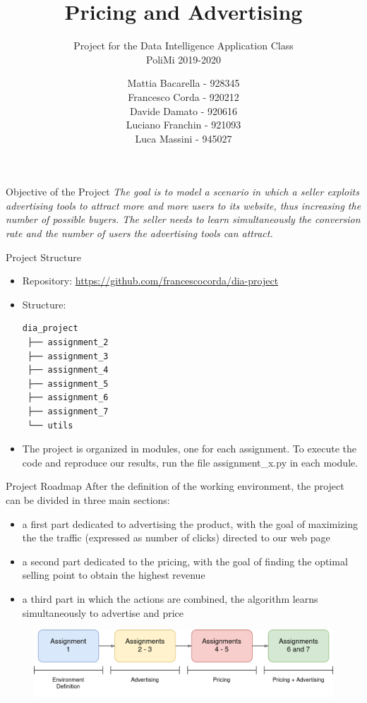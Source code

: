 \documentclass[11pt]{beamer}
\author{Mattia Bacarella - 928345\\
		Francesco Corda - 920212\\
		Davide Damato - 920616\\
		Luciano Franchin - 921093\\
		Luca Massini - 945027}
\title{Pricing and Advertising}
\subtitle{Project for the Data Intelligence Application Class\\
		PoliMi 2019-2020}
\begin{document}
\begin{frame}
\titlepage
\end{frame}


\begin{frame}{Objective of the Project}
\textit{The goal is to model a scenario in which a seller exploits advertising tools to attract more and more users to its website, thus increasing the number of possible buyers. The seller needs to learn simultaneously the conversion rate and the number of users the advertising tools can attract.}
\end{frame}

\begin{frame}[fragile]{Project Structure}
\begin{itemize}
\item Repository: \url{https://github.com/francescocorda/dia-project}
\item Structure:
\begin{verbatim}
dia_project
 ├── assignment_2
 ├── assignment_3
 ├── assignment_4
 ├── assignment_5
 ├── assignment_6
 ├── assignment_7
 └── utils
\end{verbatim}
\item The project is organized in modules, one for each assignment. To execute the code and reproduce our results, run the file assignment\_x.py in each module.
\end{itemize}
\end{frame}

\begin{frame}{Project Roadmap}
After the definition of the working environment, the project can be divided in three main sections:
\begin{itemize}
\item a first part dedicated to advertising the product, with the goal of maximizing the the traffic (expressed as number of clicks) directed to our web page
\item a second part dedicated to the pricing, with the goal of finding the optimal selling point to obtain the highest revenue
\item a third part in which the actions are combined, the algorithm learns simultaneously to advertise and price
\end{itemize}
\begin{figure}[hbtp]
\centering
\includegraphics[width=\textwidth]{images/img_01.png}
\end{figure}

\end{frame}
\end{document}
